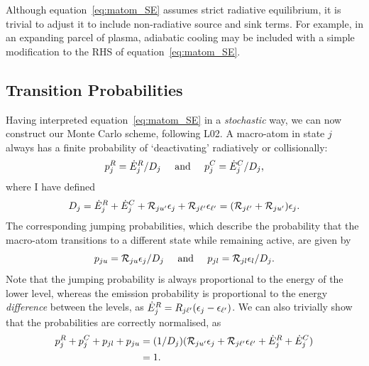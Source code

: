Although equation~\ref{eq:matom_SE} assumes strict radiative equilibrium,
it is trivial to adjust it to include non-radiative source and sink terms. 
For example, in an expanding parcel of plasma, adiabatic cooling may be 
included with a simple modification to the RHS of equation~\ref{eq:matom_SE}.



\subsection{Transition Probabilities}

Having interpreted equation~\ref{eq:matom_SE} in a {\em stochastic} way,
we can now construct our Monte Carlo scheme, following L02.
A macro-atom in state $j$ always has a finite probability of `deactivating'
radiatively or collisionally:
\begin{equation}
p_{j}^{R} = \dot{E}_{j}^{R} / D_j \;\;\;\;\; {\rm and} \;\;\;
\;\; p_{j}^{C} = \dot{E}_{j}^{C} / D_j,
\label{eq:deactivate}
\end{equation}
where I have defined
\begin{equation}
D_j =  \dot{E}_{j}^{R}+\dot{E}_{j}^{C}+{\cal R}_{j{u^\prime}}\epsilon_{j}+
 {\cal R}_{j {\ell^\prime}}\epsilon_{{\ell^\prime}} = ({\cal R}_{j{\ell^\prime}} + {\cal R}_{j{u^\prime}}) \epsilon_{j}.
\end{equation}
The corresponding jumping probabilities, 
which describe the probability
that the macro-atom transitions to a different state while remaining active, 
are given by
\begin{equation}
p_{ju} = {\cal R}_{ju} \epsilon_{j} / D_j \;\;\;\;\; {\rm and} \;\;\;
\;\; p_{jl} = {\cal R}_{jl} \epsilon_{l} / D_j.
\end{equation}
Note that the jumping probability is always proportional to the energy
of the lower level, whereas the emission probability is proportional
to the energy {\em difference} between the levels, as 
$\dot{E}_{j}^{R} = R_{j{\ell^\prime}} (\epsilon_j - \epsilon_{\ell^\prime})$. We can also
trivially show that the probabilities are correctly normalised, as
\begin{align}
p_{j}^{R} + p_{j}^{C} + p_{jl} + p_{ju} &=
(1/D_j) ( {\cal R}_{j{u^\prime}} \epsilon_{j} + {\cal R}_{j{\ell^\prime}} \epsilon_{{\ell^\prime}} +
\dot{E}_{j}^{R} + \dot{E}_{j}^{C}) \\
&= 1. \nonumber
\end{align}

